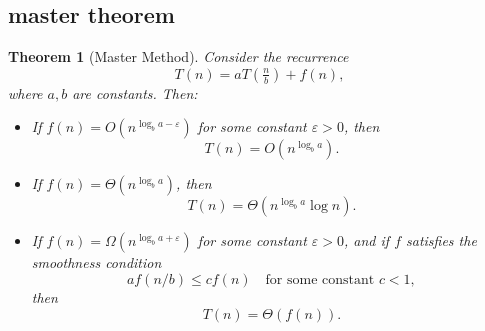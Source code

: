 \documentclass[9pt]{extarticle}
\newtheorem{theorem}{Theorem}[section]
\begin{document}
\subsection{master theorem}
\begin{theorem}[Master Method]
Consider the recurrence
\[
T(n) = aT\!\left(\tfrac{n}{b}\right) + f(n),
\]
where $a, b$ are constants. Then:
\begin{itemize}
    \item[(A)] If $f(n) = O(n^{\log_b a - \varepsilon})$ for some constant $\varepsilon > 0$, then
    \[
    T(n) = O(n^{\log_b a}).
    \]

    \item[(B)] If $f(n) = \Theta(n^{\log_b a})$, then
    \[
    T(n) = \Theta(n^{\log_b a} \log n).
    \]

    \item[(C)] If $f(n) = \Omega(n^{\log_b a + \varepsilon})$ for some constant $\varepsilon > 0$, and if $f$ satisfies the smoothness condition
    \[
    af(n/b) \leq c f(n) \quad \text{for some constant } c < 1,
    \]
    then
    \[
    T(n) = \Theta(f(n)).
    \]
\end{itemize}
\end{theorem}
\end{document}
